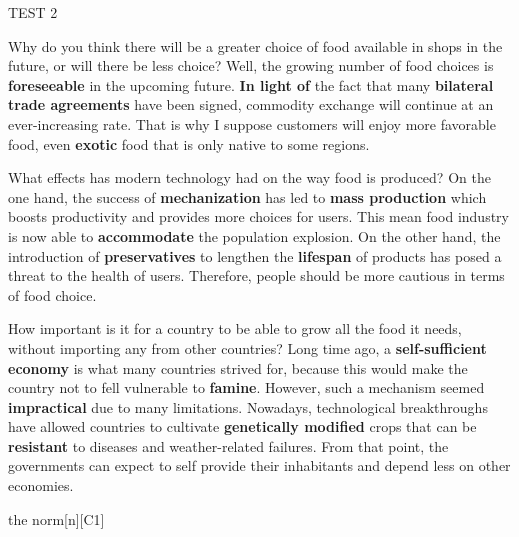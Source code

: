 \begin{glossarymc}[Cambridge 8]
\begin{test}{TEST 2}
    \begin{qa}{Why do you think there will be a greater choice of food available in shops in the future, or will there be less choice?}
    Well, the growing number of food choices is \textbf{foreseeable} in the upcoming future. \textbf{In light of} the fact that many \textbf{bilateral trade agreements} have been signed, commodity exchange will continue at an ever-increasing rate. That is why I suppose customers will enjoy more favorable food, even \textbf{exotic} food that is only native to some regions.
    \end{qa}

    \begin{qa}{What effects has modern technology had on the way food is produced?}
    On the one hand, the success of \textbf{mechanization} has led to \textbf{mass production} which boosts productivity and provides more choices for users. This mean food industry is now able to \textbf{accommodate} the population explosion. On the other hand, the introduction of \textbf{preservatives} to lengthen the \textbf{lifespan} of products has posed a threat to the health of users. Therefore, people should be more cautious in terms of food choice.
    \end{qa}

    \begin{qa}{How important is it for a country to be able to grow all the food it needs, without importing any from other countries?}
    Long time ago, a \textbf{self-sufficient economy} is what many countries strived for, because this would make the country not to fell vulnerable to \textbf{famine}. However, such a mechanism seemed \textbf{impractical} due to many limitations. Nowadays, technological breakthroughs have allowed countries to cultivate \textbf{genetically modified} crops that can be \textbf{resistant} to diseases and weather-related failures. From that point, the governments can expect to self provide their inhabitants and depend less on other economies.
    \end{qa}

        \begin{VocabExplain}[Part 3]
            \begin{ExplainCard}{the norm}[n][C1]
            \end{ExplainCard}


\end{VocabExplain}
\end{test}
\end{glossarymc}
